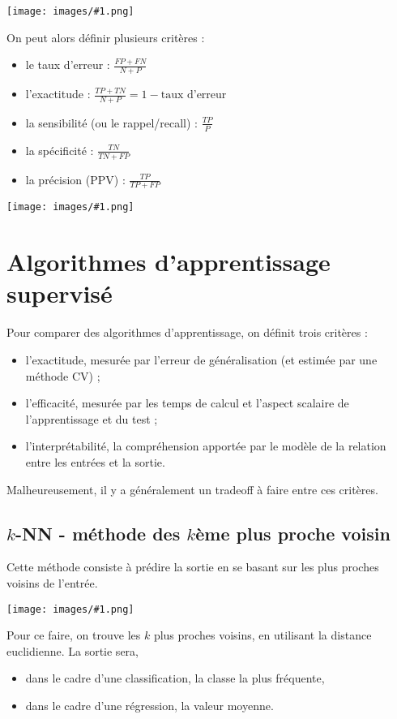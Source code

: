 \documentclass[10pt,a4paper]{report}
\newcommand{\dessin}[1]{\begin{center}\texttt{[image: images/\#1.png]}\end{center}}
\begin{document}
		\dessin{9}
		
		On peut alors définir plusieurs critères :
		
		\begin{itemize}
			\item le taux d'erreur : $\frac{FP + FN}{N + P}$
			\item l'exactitude : $\frac{TP + TN}{N + P} = 1 - \text{taux d'erreur}$
			\item la sensibilité (ou le rappel/recall) : $\frac{TP}{P}$
			\item la spécificité : $\frac{TN}{TN + FP}$
			\item la précision (PPV) : $\frac{TP}{TP + FP}$
		\end{itemize}
		
		\dessin{10}
		
	\section{Algorithmes d'apprentissage supervisé}
	
	Pour comparer des algorithmes d'apprentissage, on définit trois critères :
	
	\begin{itemize}
		\item l'exactitude, mesurée par l'erreur de généralisation (et estimée par une méthode CV) ;
		\item l'efficacité, mesurée par les temps de calcul et l'aspect scalaire de l'apprentissage et du test ;
		\item l'interprétabilité, la compréhension apportée par le modèle de la relation entre les entrées et la sortie.
	\end{itemize}
	
	Malheureusement, il y a généralement un tradeoff à faire entre ces critères.
		\subsection{$k$-NN - méthode des $k$ème plus proche voisin}
		
		Cette méthode consiste à prédire la sortie en se basant sur les plus proches voisins de l'entrée.
		
		\dessin{11}
		
		Pour ce faire, on trouve les $k$ plus proches voisins, en utilisant la distance euclidienne. La sortie sera,
		
		\begin{itemize}
			\item dans le cadre d'une classification, la classe la plus fréquente,
			\item dans le cadre d'une régression, la valeur moyenne.
		\end{itemize}
		
\end{document}
